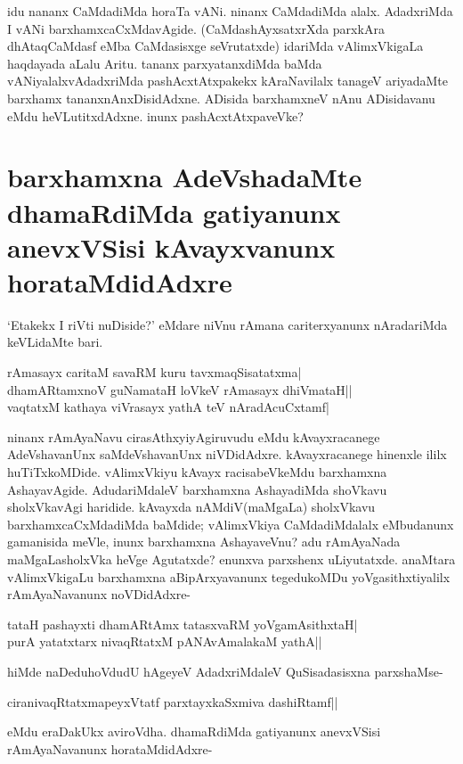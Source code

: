 idu nananx CaMdadiMda horaTa vANi. ninanx CaMdadiMda alalx. AdadxriMda I vANi barxhamxcaCxMdavAgide. (CaMdashAyxsatxrXda parxkAra dhAtaqCaMdasf eMba CaMdasisxge seVrutatxde) idariMda vAlimxVkigaLa haqdayada aLalu Aritu. tananx parxyatanxdiMda baMda vANiyalalxvAdadxriMda pashAcxtAtxpakekx kAraNavilalx tanageV ariyadaMte barxhamx tananxnAnxDisidAdxne. ADisida barxhamxneV nAnu ADisidavanu eMdu heVLutitxdAdxne. inunx pashAcxtAtxpaveVke? 

\section*{barxhamxna AdeVshadaMte dhamaRdiMda gatiyanunx anevxVSisi kAvayxvanunx horataMdidAdxre} 

`Etakekx I riVti nuDiside?' eMdare niVnu rAmana cariterxyanunx nAradariMda keVLidaMte bari. 

\begin{shloka} 
rAmasayx caritaM savaRM kuru tavxmaqSisatatxma|\label{204c}\\ 
dhamARtamxnoV guNamataH loVkeV rAmasayx dhiVmataH||\\ 
vaqtatxM kathaya viVrasayx yathA teV nAradAcuCxtamf|
\end{shloka}

ninanx rAmAyaNavu cirasAthxyiyAgiruvudu eMdu kAvayxracanege AdeVshavanUnx saMdeVshavanUnx niVDidAdxre. kAvayxracanege hinenxle ililx huTiTxkoMDide. vAlimxVkiyu kAvayx racisabeVkeMdu barxhamxna AshayavAgide. AdudariMdaleV barxhamxna AshayadiMda shoVkavu sholxVkavAgi haridide. kAvayxda nAMdiV(maMgaLa) sholxVkavu barxhamxcaCxMdadiMda baMdide; vAlimxVkiya CaMdadiMdalalx eMbudanunx gamanisida meVle, inunx barxhamxna AshayaveVnu? adu rAmAyaNada maMgaLasholxVka heVge Agutatxde? enunxva parxshenx uLiyutatxde. anaMtara vAlimxVkigaLu barxhamxna aBipArxyavanunx tegedukoMDu yoVgasithxtiyalilx rAmAyaNavanunx noVDidAdxre- 

\begin{shloka}
tataH pashayxti dhamARtAmx tatasxvaRM yoVgamAsithxtaH|\label{204}\\ 
purA yatatxtarx nivaqRtatxM pANAvAmalakaM yathA|| 
\end{shloka}
hiMde naDeduhoVdudU hAgeyeV AdadxriMdaleV QuSisadasisxna parxshaMse- 

\begin{shloka}
ciranivaqRtatxmapeyxVtatf parxtayxkaSxmiva dashiRtamf||\label{204b}
\end{shloka}
eMdu eraDakUkx aviroVdha. dhamaRdiMda gatiyanunx anevxVSisi rAmAyaNavanunx horataMdidAdxre- 

